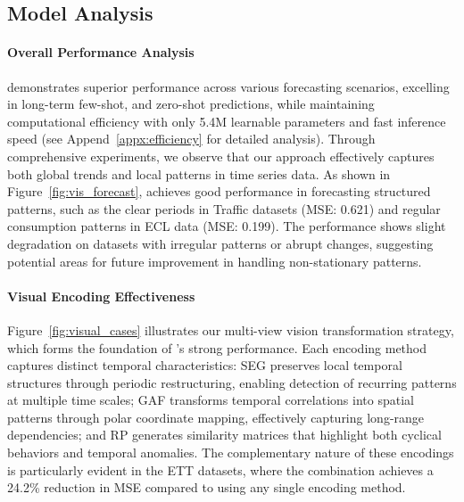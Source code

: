 \subsection{Model Analysis}
\paragraph{Overall Performance Analysis}
\model demonstrates superior performance across various forecasting scenarios, excelling in long-term few-shot, and zero-shot predictions, while maintaining computational efficiency with only 5.4M learnable parameters and fast inference speed (see Append~\ref{appx:efficiency} for detailed analysis). Through comprehensive experiments, we observe that our approach effectively captures both global trends and local patterns in time series data. As shown in Figure~\ref{fig:vis_forecast}, \model achieves good performance in forecasting structured patterns, such as the clear periods in Traffic datasets (MSE: 0.621) and regular consumption patterns in ECL data (MSE: 0.199). The performance shows slight degradation on datasets with irregular patterns or abrupt changes, suggesting potential areas for future improvement in handling non-stationary patterns.


\paragraph{Visual Encoding Effectiveness}
Figure~\ref{fig:visual_cases} illustrates our multi-view vision transformation strategy, which forms the foundation of \model's strong performance. Each encoding method captures distinct temporal characteristics: SEG preserves local temporal structures through periodic restructuring, enabling detection of recurring patterns at multiple time scales; GAF transforms temporal correlations into spatial patterns through polar coordinate mapping, effectively capturing long-range dependencies; and RP generates similarity matrices that highlight both cyclical behaviors and temporal anomalies. The complementary nature of these encodings is particularly evident in the ETT datasets, where the combination achieves a 24.2\% reduction in MSE compared to using any single encoding method.

